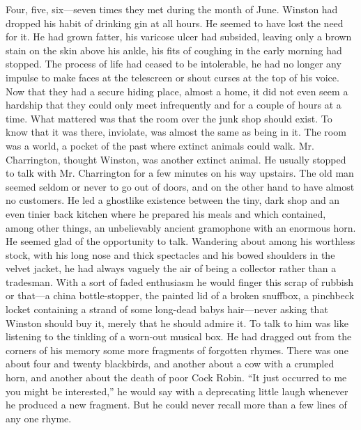 \begin{paracol}{2}
Four, five, six---seven times they met during the month of June. Winston
had dropped his habit of drinking gin at all hours. He seemed to have
lost the need for it. He had grown fatter, his varicose ulcer had
subsided, leaving only a brown stain on the skin above his ankle, his
fits of coughing in the early morning had stopped. The process of life
had ceased to be intolerable, he had no longer any impulse to make faces
at the telescreen or shout curses at the top of his voice. Now that they
had a secure hiding place, almost a home, it did not even seem a
hardship that they could only meet infrequently and for a couple of
hours at a time. What mattered was that the room over the junk shop
should exist. To know that it was there, inviolate, was almost the same
as being in it. The room was a world, a pocket of the past where extinct
animals could walk. Mr. Charrington, thought Winston, was another
extinct animal. He usually stopped to talk with Mr. Charrington for a
few minutes on his way upstairs. The old man seemed seldom or never to
go out of doors, and on the other hand to have almost no customers. He
led a ghostlike existence between the tiny, dark shop and an even tinier
back kitchen where he prepared his meals and which contained, among
other things, an unbelievably ancient gramophone with an enormous horn.
He seemed glad of the opportunity to talk. Wandering about among his
worthless stock, with his long nose and thick spectacles and his bowed
shoulders in the velvet jacket, he had always vaguely the air of being a
collector rather than a tradesman. With a sort of faded enthusiasm he
would finger this scrap of rubbish or that---a china bottle-stopper, the
painted lid of a broken snuffbox, a pinchbeck locket containing a strand
of some long-dead baby\textquotesingle s hair---never asking that
Winston should buy it, merely that he should admire it. To talk to him
was like listening to the tinkling of a worn-out musical box. He had
dragged out from the corners of his memory some more fragments of
forgotten rhymes. There was one about four and twenty blackbirds, and
another about a cow with a crumpled horn, and another about the death of
poor Cock Robin. ``It just occurred to me you might be interested,'' he
would say with a deprecating little laugh whenever he produced a new
fragment. But he could never recall more than a few lines of any one
rhyme.

\switchcolumn


\end{paracol}
